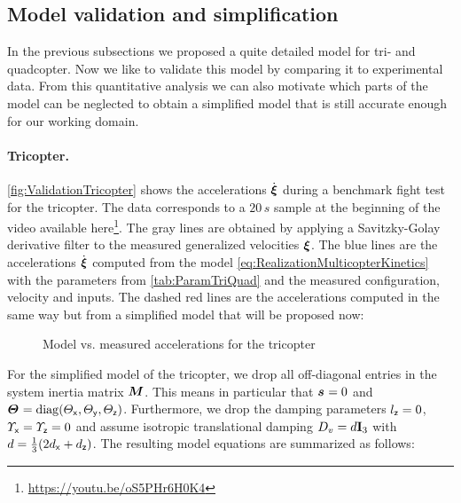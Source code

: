 \clearpage
\subsection{Model validation and simplification}
In the previous subsections we proposed a quite detailed model for tri- and quadcopter.
Now we like to validate this model by comparing it to experimental data.
From this quantitative analysis we can also motivate which parts of the model can be neglected to obtain a simplified model that is still accurate enough for our working domain.

\paragraph*{Tricopter.}
\autoref{fig:ValidationTricopter} shows the accelerations $\sysVeld$ during a benchmark fight test for the tricopter.
The data corresponds to a $20\,\unit{s}$ sample at the beginning of the video available here\footnote{\url{https://youtu.be/oS5PHr6H0K4}}.
The gray lines are obtained by applying a Savitzky-Golay derivative filter to the measured generalized velocities $\sysVel$.
The blue lines are the accelerations $\sysVeld$ computed from the model \eqref{eq:RealizationMulticopterKinetics} with the parameters from \autoref{tab:ParamTriQuad} and the measured configuration, velocity and inputs.
The dashed red lines are the accelerations computed in the same way but from a simplified model that will be proposed now:

\begin{figure}[p]
 \centering
 \footnotesize%
 
 \vspace{-20pt}
 \caption{Model vs. measured accelerations for the tricopter}
 \label{fig:ValidationTricopter}
\end{figure}

For the simplified model of the tricopter, we drop all off-diagonal entries in the system inertia matrix $\sysInertiaMat$.
This means in particular that $\bodyCOM{}{}{} = 0$ and $\bodyMOI{}{}{} = \diag(\Jx, \Jy, \Jz)$.
Furthermore, we drop the damping parameters $\lz=0$, $\sigx=\sigz=0$ and assume isotropic translational damping $D_v = \DampingSym \idMat[3]$ with $\DampingSym = \tfrac{1}{3}(2\dvx + \dvz)$.
The resulting model equations are summarized as follows:

